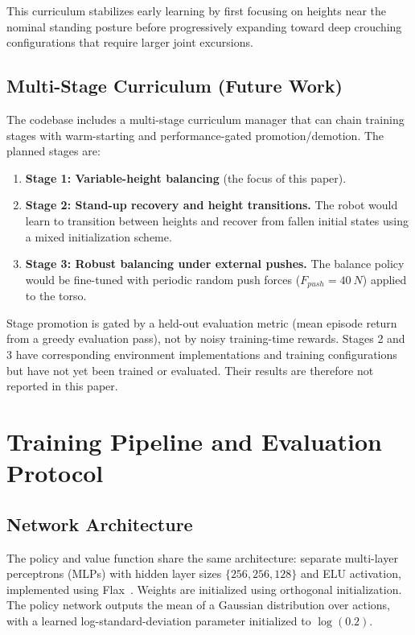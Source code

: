 \documentclass[conference]{IEEEtran}
\begin{document}
This curriculum stabilizes early learning by first focusing on heights near the nominal standing posture before progressively expanding toward deep crouching configurations that require larger joint excursions.

\subsection{Multi-Stage Curriculum (Future Work)}
\label{sec:multi_stage}
The codebase includes a multi-stage curriculum manager that can chain training stages with warm-starting and performance-gated promotion/demotion. The planned stages are:
\begin{enumerate}
    \item \textbf{Stage 1: Variable-height balancing} (the focus of this paper).
    \item \textbf{Stage 2: Stand-up recovery and height transitions.} The robot would learn to transition between heights and recover from fallen initial states using a mixed initialization scheme.
    \item \textbf{Stage 3: Robust balancing under external pushes.} The balance policy would be fine-tuned with periodic random push forces ($F_{push} = \SI{40}{N}$) applied to the torso.
\end{enumerate}

Stage promotion is gated by a held-out evaluation metric (mean episode return from a greedy evaluation pass), not by noisy training-time rewards. Stages 2 and 3 have corresponding environment implementations and training configurations but have not yet been trained or evaluated. Their results are therefore not reported in this paper.

\section{Training Pipeline and Evaluation Protocol}

\subsection{Network Architecture}
The policy and value function share the same architecture: separate multi-layer perceptrons (MLPs) with hidden layer sizes $\{256, 256, 128\}$ and ELU activation, implemented using Flax~\cite{flax}. Weights are initialized using orthogonal initialization. The policy network outputs the mean of a Gaussian distribution over actions, with a learned log-standard-deviation parameter initialized to $\log(0.2)$.
\end{document}
